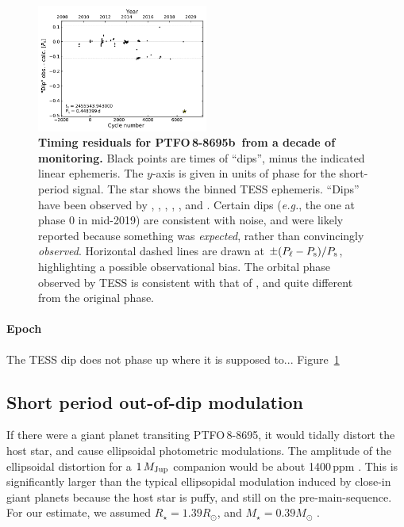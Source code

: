 \documentclass[12pt,twocolumn,tighten]{aastex62}
\newcommand{\ptfo}{PTFO$\,$8-8695}
\newcommand{\ptfob}{PTFO$\,$8-8695b}
\begin{document}
\begin{figure}[t]
	\begin{center}
		\leavevmode
		\includegraphics[width=0.5\textwidth]{f6.pdf}
	\end{center}
	\vspace{-0.7cm}
	\caption{
		{\bf Timing residuals for \ptfob\ from a decade of monitoring.}
		Black points are times of ``dips'', minus the indicated linear
		ephemeris.  The $y$-axis is given in units of phase for the
		short-period signal.  The star shows the binned TESS ephemeris.
		``Dips'' have been observed by \citet{van_eyken_ptf_2012},
		\citet{ciardi_followup_2015}, \citet{yu_tests_2015},
		\citet{raetz_yeti_2016}, \citet{onitsuka_multicolor_2017}, and
		\citet{tanimoto_evidence_2020}.  Certain dips ({\it e.g.}, the one
		at phase 0 in mid-2019) are consistent with noise, and were likely
		reported because something was {\it expected}, rather than
		convincingly {\it observed}.  Horizontal dashed lines are drawn at
		$\pm (P_{\rm \ell} - P_{\rm s})/P_{\rm s}$, highlighting a
    possible observational bias.  The orbital phase observed by TESS
    is consistent with that of \citet{tanimoto_evidence_2020}, and
    quite different from the original phase.
		\label{fig:o_minus_c}
	}
\end{figure}

\paragraph{Epoch}
The TESS dip does not phase up where it is supposed to...
Figure~\ref{fig:o_minus_c}

\subsection{Short period out-of-dip modulation}
If there were a giant planet transiting \ptfo, it would tidally
distort the host star, and cause ellipsoidal photometric modulations.
The amplitude of the ellipsoidal distortion for a $1\,M_{\rm Jup}$
companion would be about 1400$\,$ppm
\citep{shporer_astrophysics_2017}.  This is significantly larger than
the typical ellipsopidal modulation induced by close-in giant planets
because the host star is puffy, and still on the pre-main-sequence.
For our estimate, we assumed $R_\star = 1.39 R_\odot$, and $M_\star =
0.39 M_\odot$ \citep{van_eyken_ptf_2012}. 
\end{document}
